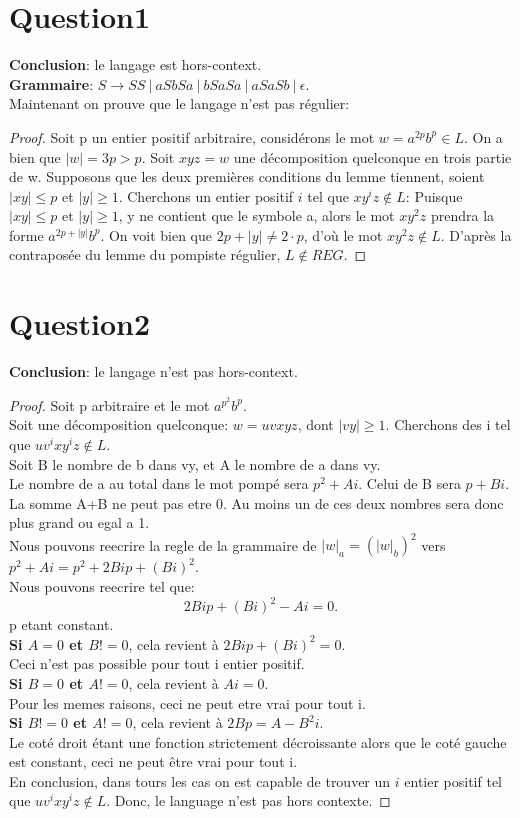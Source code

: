 \documentclass{article}
\begin{document}
\section*{Question1}
\textbf{Conclusion}: le langage est hors-context.\\
\textbf{Grammaire}: $S\to SS\ |\ aSbSa\ |\ bSaSa\ |\ aSaSb\ |\ \epsilon$.\\
Maintenant on prouve que le langage n'est pas régulier:
\begin{proof}
	Soit p un entier positif arbitraire, considérons le mot $w = a^{2p}b^{p} \in L$. On a bien que $ |w| = 3p > p$.
	Soit $xyz = w$ une décomposition quelconque en trois partie de w. Supposons que les deux premières conditions du lemme tiennent, soient $|xy| \le  p$ et $|y| \ge  1$. Cherchons un entier positif $i$ tel que $xy^{i}z \not\in L$: Puisque $ |xy| \le p \text{ et } |y| \ge 1$, y ne contient que le symbole a, alors le mot $xy^{2}z$ prendra la forme $a^{2p+ |y|}b^{p}$. On voit bien que $2p + |y| \neq 2\cdot p$, d'où le mot $xy^{2}z \not\in L$. D'après la contraposée du lemme du pompiste régulier, $L \not\in REG$.
\end{proof}
\section*{Question2}
\textbf{Conclusion}: le langage n'est pas hors-context.\\
\begin{proof}
Soit p arbitraire et le mot $a^{p^{2}}b^{p}$.\\
Soit une décomposition quelconque: $w = uvxyz$, dont $|vy| \ge 1.$ Cherchons des i tel que $uv^{i}xy^{i}z \not\in L.$\\
Soit B le nombre de b dans vy, et A le nombre de a dans vy.\\
Le nombre de a au total dans le mot pompé sera $p^{2}+Ai$. Celui de B sera $p+Bi$.\\ 
La somme A+B ne peut pas etre 0. Au moins un de ces deux nombres sera donc plus grand ou egal a 1.\\
Nous pouvons reecrire la regle de la grammaire de $|w|_{a} = \left( |w|_{b} \right)^{2}$ vers $p^{2} + Ai = p^2 + 2Bip + (Bi)^2$.\\
Nous pouvons reecrire tel que:
\[
2Bip+(Bi)^2-Ai= 0
.\] 
p etant constant.\\
\textbf{Si $A = 0$ et $B!=0$}, cela revient à $2Bip + \left( Bi \right)^{2} = 0 $.\\
Ceci n'est pas possible pour tout i entier positif.\\
\textbf{Si $B=0$ et $A!=0$}, cela revient à $Ai = 0$.\\
Pour les memes raisons, ceci ne peut etre vrai pour tout i.\\
\textbf{Si $B!=0$ et $A!=0$}, cela revient à $2Bp = A-B^2i$.\\
Le coté droit étant une fonction strictement décroissante alors que le coté gauche est constant, ceci ne peut être vrai pour tout i.\\
En conclusion, dans tours les cas on est capable de trouver un $i$ entier positif tel que $uv^{i}xy^{i}z \not\in L$.
Donc, le language n'est pas hors contexte. 
\end{proof}
\end{document}
